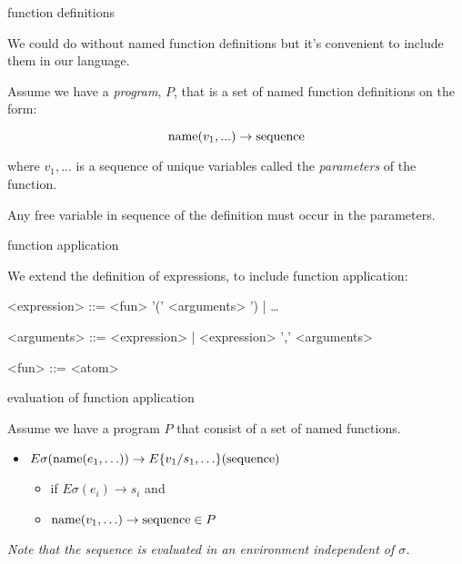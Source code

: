  

\begin{frame}{function definitions}

We could do without named  function definitions  but it's convenient to include them in our language. 

\vspace{20pt}

Assume we have a {\em program}, $P$, that is a set of named function definitions on the form:

  $${\rm name}(v_1, ...) \rightarrow  {\rm sequence}$$

where $v_1, ...$ is a sequence of unique variables called the {\em parameters} of the function. 

\pause \vspace{20pt}

Any free variable in sequence of the definition must occur in the parameters.

\end{frame}

\begin{frame}{function application}

We extend the definition of expressions, to include function application:

\pause
\begin{grammar}
<expression> ::= <fun> '(' <arguments> ') | \ldots

<arguments> ::= <expression> | <expression> ',' <arguments>

<fun> ::= <atom>
\end{grammar}


\end{frame}


\begin{frame}{evaluation of function application}

Assume we have a program $P$ that consist of a set of named functions. 

 \begin{itemize} 
  \pause\item $E\sigma({\rm name}(e_1, \ldots)) \rightarrow E\{v_1/s_1, \ldots\}({\rm sequence} )$ 
   \begin{itemize}        
           \pause\item if $E\sigma(e_i) \rightarrow s_i$ and 
           \pause\item ${\rm name}(v_1, \ldots) \rightarrow  {\rm sequence}  \in P$ 
    \end{itemize} 
 \end{itemize} 

\pause\vspace{20pt}

{\em Note that the sequence is evaluated in an environment independent of $\sigma$.}

\end{frame}

